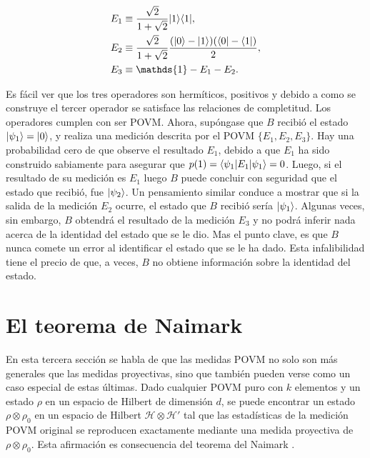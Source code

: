 	\begin{align}
		E_1 & \equiv \dfrac{\sqrt{2}}{1+\sqrt{2}} |1\rala1|, \label{eq11} \\
		E_2 & \equiv \dfrac{\sqrt{2}}{1+\sqrt{2}} \dfrac{(|0\ra -|1\ra)(\la0|-\la1|)}{2}, \label{eq12} \\
		E_3 & \equiv \mathds{1}-E_1-E_2\label{eq13}. 
	\end{align}



Es fácil ver que los tres operadores son hermíticos, positivos y debido a como se construye el tercer operador se satisface las relaciones de completitud. Los operadores cumplen con ser POVM\@. Ahora, supóngase que $B$ recibió el estado $|\psi_1\rangle=|0\rangle$, y realiza una medición descrita por el POVM $\{E_1,E_2,E_3\}$. Hay una probabilidad cero de que observe el resultado $E_1$, debido a que $E_1$ ha sido construido sabiamente para asegurar que $p(1)=\langle\psi_1|E_1|\psi_1\rangle=0$. Luego, si el resultado de su medición es $E_1$ luego $B$ puede concluir con seguridad que el estado que recibió, fue $|\psi_2\rangle $. Un pensamiento similar conduce a mostrar que si la salida de la medición $E_2$ ocurre, el estado que $B$ recibió sería $|\psi_1\rangle$. Algunas veces, sin embargo, $B$ obtendrá el resultado de la medición $E_3$ y no podrá inferir nada acerca de la identidad del estado que se le dio. Mas el punto clave, es que $B$ nunca comete un error al identificar el estado que se le ha dado. Esta infalibilidad tiene el precio de que, a veces, $B$ no obtiene información sobre la identidad del estado.



\section{El teorema de Naimark}

En esta tercera sección se habla de que las medidas POVM no solo son más generales que las medidas proyectivas, sino que también pueden verse como un caso especial de estas últimas. Dado cualquier POVM puro con $k$ elementos y un estado $\rho$ en un espacio de Hilbert de dimensión $d$, se puede encontrar un estado $\rho \otimes \rho_0$ en un espacio de Hilbert  $\mathcal{H}\otimes\mathcal{H'}$ tal que las estadísticas de la medición POVM original se reproducen exactamente mediante una medida proyectiva de $\rho \otimes \rho_0$. Esta afirmación es consecuencia del teorema del Naimark {\cite{2007geometry}}.




